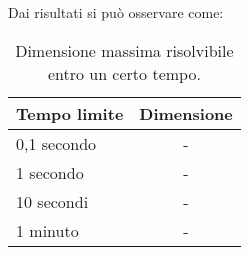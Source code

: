 Dai risultati si può osservare come:

%
\begin{table}[!h]
	\centering
	\begin{tabular}{l|c}\hline
	Tempo limite & Dimensione  \\ \hline
	0,1 secondo & -  \\ \hline
	1 secondo & -  \\ \hline
	10 secondi & -  \\ \hline
	1 minuto & -  \\ \hline
	\end{tabular}
	\caption{Dimensione massima risolvibile entro un certo tempo.}
	\label{tab:dimensione-massima-tempi-cplex}
\end{table}
%


